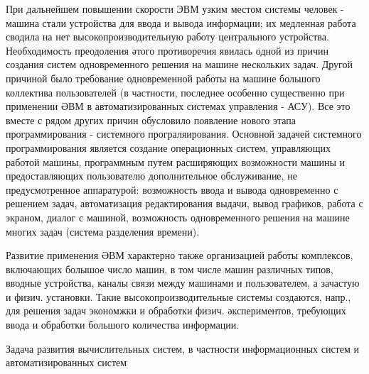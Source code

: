 \documentclass[10pt]{article}
\begin{document}
При дальнейшем повышении скорости ЭВМ узким местом системы человек - машина стали устройства для ввода и вывода информации; их медленная работа сводила на нет высокопроизводительную работу центрального устройства. Необходимость преодоления әтого противоречия явилась одной из причин создания систем одновременного решения на машине нескольких задач. Другой причиной было требование одновременной работы на машине большого коллектива пользователей (в частности, последнее особенно существенно при применении ӘВМ в автоматизированных системах управления - АСУ). Все это вместе с рядом других причин обусловило появление нового этапа программирования - системного програляирования. Основной задачей системного программирования является создание операционных систем, управляющих работой машины, программным путем расширяющих возможности машины и предоставляющих пользователю дополнительное обслуживание, не предусмотренное аппаратурой: возможность ввода и вывода одновременно с решением задач, автоматизация редактирования выдачи, вывод графиков, работа с экраном, диалог с машиной, возможность одновременного решения на машине многих задач (система разделения времени).



Развитие применения ӘВМ характерно также организацией работы комплексов, включающих болышое число машин, в том числе машин различных типов, вводные устройства, каналы связи между машинами и пользователем, а зачастую и физич. установки. Такие высокопроизводительные системы создаются, напр., для решения задач экономжки и обработки физич. әкспериментов, требующих ввода и обработки большого количества информации.



Задача развития вычислительных систем, в частности информационных систем и автоматизированных систем
\end{document}
